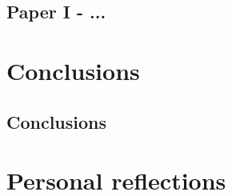 \documentclass[openany,g5paper,electronic]{kthesis}
\begin{document}
\section{Paper I - ...}

\chapter{Conclusions}
\label{Conclusions}
\noindent \lipsum[1]

\section{Conclusions}
\noindent \lipsum[1]

\chapter{Personal reflections}
\label{PersonalReflections}
\noindent \lipsum[1]


\renewcommand{\bibname}{References}%


\printindex
\end{document}
